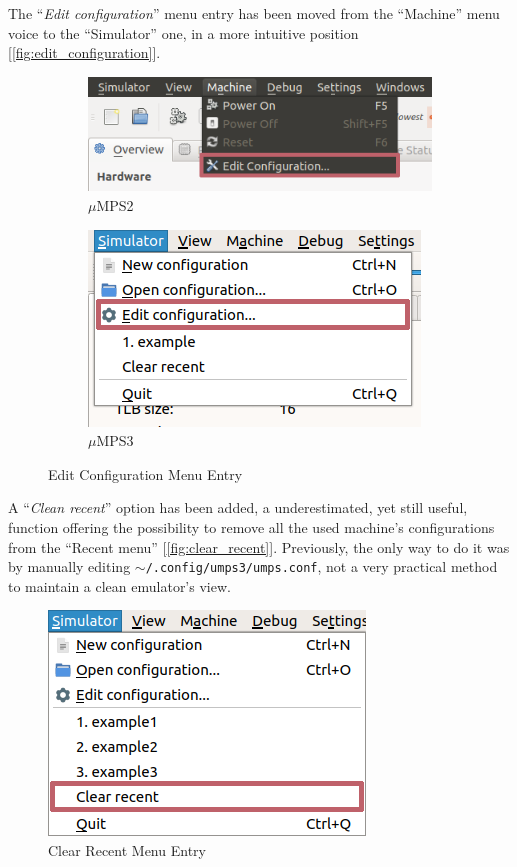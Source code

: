 \documentclass[12pt,a4paper,openright,twoside]{report}
\begin{document}
The ``\textit{Edit configuration}'' menu entry has been moved from the ``Machine'' menu voice to the ``Simulator'' one, in a more intuitive position [\autoref{fig:edit_configuration}].
\clearpage
\begin{figure}[h]
	\centering
	\begin{subfigure}[h]{\textwidth}
		\centering
		\includegraphics[scale=0.75]{edit_configuration_old}
		\caption{$\mu$MPS2}
		\label{fig:edit_configuration_old}
	\end{subfigure}
	\newline
	\begin{subfigure}[h]{\textwidth}
		\centering
		\includegraphics[scale=0.75]{edit_configuration}
		\caption{$\mu$MPS3}
		\label{fig:edit_configuration_new}
	\end{subfigure}
	\caption{Edit Configuration Menu Entry}
	\label{fig:edit_configuration}
\end{figure}

A ``\textit{Clean recent}'' option has been added, a underestimated, yet still useful, function offering the possibility to remove all the used machine's configurations from the ``Recent menu'' [\autoref{fig:clear_recent}].
Previously, the only way to do it was by manually editing \texttt{$\sim$/.config/umps3/umps.conf}, not a very practical method to maintain a clean emulator's view.
\begin{figure}[h]
	\centering
	\includegraphics[scale=0.75]{clear_recent}
	\caption{Clear Recent Menu Entry}
	\label{fig:clear_recent}
\end{figure}
\end{document}
